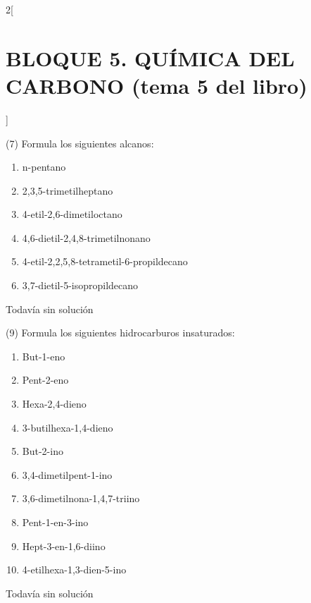 \documentclass[10pt]{article}
\begin{document}
\begin{multicols}{2}[
  \section{BLOQUE 5. QUÍMICA DEL CARBONO (tema 5 del libro)}
  ]

\begin{exercise}
  (7) Formula los siguientes alcanos:
  \begin{enumerate}
    \item n-pentano
    \item 2,3,5-trimetilheptano
    \item 4-etil-2,6-dimetiloctano
    \item 4,6-dietil-2,4,8-trimetilnonano
    \item 4-etil-2,2,5,8-tetrametil-6-propildecano
    \item 3,7-dietil-5-isopropildecano
  \end{enumerate}
\end{exercise}

\begin{solution}[print=false]
  Todavía sin solución
\end{solution}

\begin{exercise}
  (9) Formula los siguientes hidrocarburos insaturados:
  \begin{enumerate}
    \item But-1-eno
    \item Pent-2-eno
    \item Hexa-2,4-dieno
    \item 3-butilhexa-1,4-dieno
    \item But-2-ino
    \item 3,4-dimetilpent-1-ino
    \item 3,6-dimetilnona-1,4,7-triino
    \item Pent-1-en-3-ino
    \item Hept-3-en-1,6-diino
    \item 4-etilhexa-1,3-dien-5-ino
  \end{enumerate}
\end{exercise}

\begin{solution}[print=false]
  Todavía sin solución
\end{solution}


\end{multicols}
\end{document}

